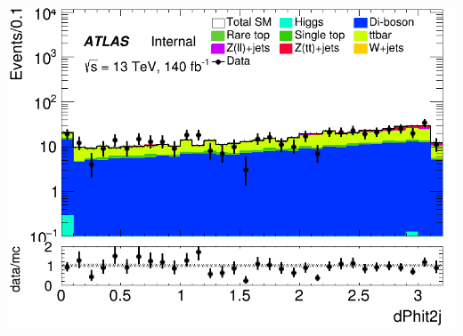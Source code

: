 \documentclass[usenames,dvipsnames]{beamer}
\begin{document}
\begin{frame}
\begin{minipage}{0.32\textwidth}
        \includegraphics[width=\textwidth]{graphics/LLH_met/LLH_met_dPhit2j.png}
    \end{minipage}
    
    \vspace{0.5cm} %


\end{frame}
\end{document}
